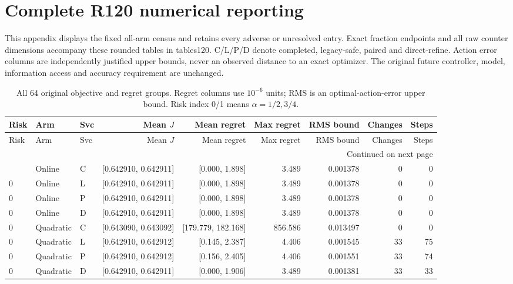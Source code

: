 \section{Complete R120 numerical reporting}\label{sec:developmentresults120}

This appendix displays the fixed all-arm census and retains every adverse or unresolved entry. Exact fraction endpoints and all raw counter dimensions accompany these rounded tables in tables120. C/L/P/D denote completed, legacy-safe, paired and direct-refine. Action error columns are independently justified upper bounds, never an observed distance to an exact optimizer. The original future controller, model, information access and accuracy requirement are unchanged.

\begingroup
\scriptsize
\setlength{\tabcolsep}{3pt}
\begin{longtable}{lllrrrrrr}
\caption{All 64 original objective and regret groups. Regret columns use $10^{-6}$ units; RMS is an optimal-action-error upper bound. Risk index 0/1 means $\alpha=1/2,3/4$.}\label{tab:allobjective120}\\
\toprule
Risk & Arm & Svc & Mean $J$ & Mean regret & Max regret & RMS bound & Changes & Steps \\ \midrule
\endfirsthead
\toprule
Risk & Arm & Svc & Mean $J$ & Mean regret & Max regret & RMS bound & Changes & Steps \\ \midrule
\endhead
\midrule\multicolumn{9}{r}{Continued on next page}\\\endfoot
\bottomrule\endlastfoot
0 & Online & C & [0.642910, 0.642911] & [0.000, 1.898] & 3.489 & 0.001378 & 0 & 0 \\
0 & Online & L & [0.642910, 0.642911] & [0.000, 1.898] & 3.489 & 0.001378 & 0 & 0 \\
0 & Online & P & [0.642910, 0.642911] & [0.000, 1.898] & 3.489 & 0.001378 & 0 & 0 \\
0 & Online & D & [0.642910, 0.642911] & [0.000, 1.898] & 3.489 & 0.001378 & 0 & 0 \\
0 & Quadratic & C & [0.643090, 0.643092] & [179.779, 182.168] & 856.586 & 0.013497 & 0 & 0 \\
0 & Quadratic & L & [0.642910, 0.642912] & [0.145, 2.387] & 4.406 & 0.001545 & 33 & 75 \\
0 & Quadratic & P & [0.642910, 0.642912] & [0.156, 2.405] & 4.406 & 0.001551 & 33 & 74 \\
0 & Quadratic & D & [0.642910, 0.642911] & [0.000, 1.906] & 3.489 & 0.001381 & 33 & 33 \\

\end{longtable}
